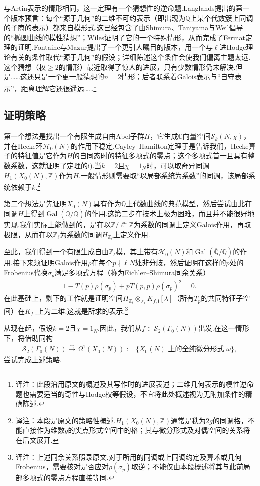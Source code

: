 \begin{remark*}[关于逆命题]

与Artin表示的情形相同，这一定理有一个猜想性的逆命题.Langlands提出的第一个版本预言：每个``源于几何''的二维不可约表示（即出现为$\mathbb Q$上某个代数簇上同调的子商的表示）都来自模形式.这已经包含了由Shimura、Taniyama与Weil倡导的``椭圆曲线的模性猜想''；Wiles证明了它的一个特殊情形，从而完成了Fermat定理的证明.Fontaine与Mazur提出了一个更引人瞩目的版本，用一个与$\ell$进Hodge理论有关的条件取代``源于几何''的假设；详细陈述这个条件会使我们偏离主题太远.这个猜想（权$\geqslant2$的情形）最近取得了惊人的进展，只有少数情形仍未解决.但是……这还只是一个更一般猜想的$n=2$情形；后者联系着Galois表示与``自守表示''，距离理解它还很遥远……\footnote{译注：此段沿用原文的概述及其写作时的进展表述；二维几何表示的模性逆命题也需要适当的奇性与Hodge权等假设，不宜将此处概述视为无附加条件的精确陈述.}

\end{remark*}



\subsection{证明策略}\label{sec:modular-2-1-4}

第一个想法是找出一个有限生成自由Abel子群$H$，它生成$\mathbb C$向量空间$\mathcal S_k(N,\chi)$，并在Hecke环$\mathcal H_0(N)$的作用下稳定.Cayley--Hamilton定理于是告诉我们，Hecke算子的特征值是它作为$H$的自同态时的特征多项式的零点；这个多项式首一且具有整数系数，这就证明了定理的i).当$k=2$且$\chi=1_N$时，可以取奇异同调$H_1(X_0(N),\mathbb Z)$作为$H$.一般情形则需要取``以局部系统为系数''的同调，该局部系统依赖于$k$.\footnote{译注：本段是原文的策略性概述.$H_1(X_0(N),\mathbb Z)$通常是秩为$2g$的同调格，不能直接作为维数$g$的尖点形式空间中的格；其与微分形式及对偶空间的关系将在后文展开.}

第二个想法是先证明$X_0(N)$具有作为$\mathbb Q$上代数曲线的典范模型，然后尝试由此在同调$H$上得到$\operatorname{Gal}(\overline{\mathbb Q}/\mathbb Q)$的作用.这第二步在技术上极为困难，而且并不能很好地实现.我们实际上能做到的，是在以$\mathbb Z/\ell^n\mathbb Z$为系数的同调上定义Galois作用，再取极限，从而在以$\mathbb Z_\ell$为系数的同调$H_{\mathbb Z_\ell}$上定义作用.

至此，我们得到一个有限生成自由$\mathbb Z_\ell$模，其上带有$\mathcal H_0(N)$和$\operatorname{Gal}(\overline{\mathbb Q}/\mathbb Q)$的作用.接下来须证明Galois作用$\rho$在每个$p\nmid\ell N$处非分歧，然后证明在这样的$p$处的Frobenius代换$\sigma_p$满足多项式方程（称为Eichler--Shimura同余关系）
\begin{align*}
1-T(p)\rho(\sigma_p)+pT(p,p)\rho(\sigma_p)^2=0.
\end{align*}
在此基础上，剩下的工作就是证明空间$H_{\mathbb Z_\ell}\otimes_{\mathbb Z_\ell}K_{f,\mathfrak l}[\lambda]$（所有$T_p$的共同特征子空间）在$K_{f,\mathfrak l}$上为二维.这就是所求的表示.\footnote{译注：上述同余关系照录原文.对于所用的同调或上同调约定及算术或几何Frobenius，需要核对是否应对$\rho(\sigma_p)$取逆；不能仅由本段概述将其与此前局部多项式的零点方程直接等同.}

从现在起，假设$k=2$且$\chi=1_N$.因此，我们从$f\in\mathcal S_2(\Gamma_0(N))$出发.在这一情形下，将借助同构
\begin{align*}
\mathcal S_2(\Gamma_0(N))\xrightarrow{\sim}\Omega^1(X_0(N))
:=\{X_0(N)\text{ 上的全纯微分形式 }\omega\},
\end{align*}
尝试完成上述策略.

